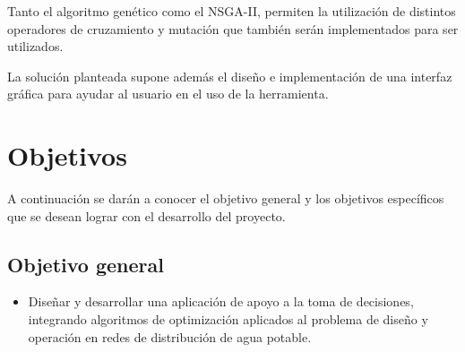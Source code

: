 \documentclass[11pt,letterpaper]{article}
\begin{document}
Tanto el algoritmo genético como el NSGA-II, permiten la utilización de distintos operadores de cruzamiento y mutación que también serán implementados para ser utilizados. 

La solución planteada supone además el diseño e implementación de una interfaz gráfica para ayudar al usuario en el uso de la herramienta.

\section{Objetivos}

A continuación se darán a conocer el objetivo general y los objetivos específicos que se desean lograr con el desarrollo del proyecto.

\subsection{Objetivo general}

\begin{itemize}
\item Diseñar y desarrollar una aplicación de apoyo a la toma de decisiones, integrando algoritmos de optimización aplicados al problema de diseño y operación en redes de distribución de agua potable.
\end{itemize}
\end{document}

